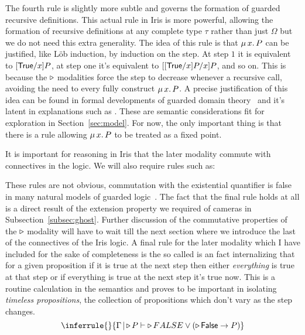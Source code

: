 \documentclass{amsart}
\newcommand{\provesJ}[3]{#1 \mathop{\vert} #2 \proves #3}
\newcommand{\provesIffJ}[3]{#1 \mathop{\vert} #2 \provesIff #3}
\begin{document}
The fourth rule is slightly more subtle and governs the formation of
guarded recursive definitions. This actual rule in Iris is more
powerful, allowing the formation of recursive definitions at any
complete type $\tau$ rather than just $\Omega$ but we do not need this
extra generality. The idea of this rule is that $\MU x. P$ can be
justified, like L\"ob induction, by induction on the step. At step $1$
it is equivalent to $[\textsf{True}/x]P$, at step one it's equivalent to
$[[\textsf{True}/x]P/x]P$, and so on. This is because the $\mathop{{\triangleright}}$ modalities
force the step to decrease whenever a recursive call, avoiding the
need to every fully construct $\MU x. P$. A precise justification of
this idea can be found in formal developments of guarded domain
theory~\citep{Birkedal:10,Birkedal:11} and it's latent in explanations
such as \citet{America:89}. These are semantic considerations fit for
exploration in Section~\ref{sec:model}. For now, the only important
thing is that there is a rule allowing $\MU x. P$ to be treated as a
fixed point.

It is important for reasoning in Iris that the later modality commute
with connectives in the logic. We will also require rules such as:
These rules are not obvious, commutation with the existential
quantifier is false in many natural models of guarded
logic~\citep{Gianantonio:02,Gianantonio:04,Svendsen:16}. The fact that
the final rule holds at all is a direct result of the extension
property we required of cameras in
Subsection~\ref{subsec:ghost}. Further discussion of the commutative
properties of the $\mathop{{\triangleright}}$ modality will have to wait till the next
section where we introduce the last of the connectives of the Iris
logic. A final rule for the later modality which I have included for
the sake of completeness is the so called is an fact internalizing
that for a given proposition if it is true at the next step then
either \emph{everything} is true at that step or if everything is true
at the next step it's true now. This is a routine calculation in the
semantics and proves to be important in isolating \emph{timeless
  propositions}, the collection of propositions which don't vary as
the step changes.
\[
  \inferrule{ }{
    \provesJ{\Gamma}{\later P}{\later FALSE \lor (\later \FALSE \to P)}
  }
\]
\end{document}
